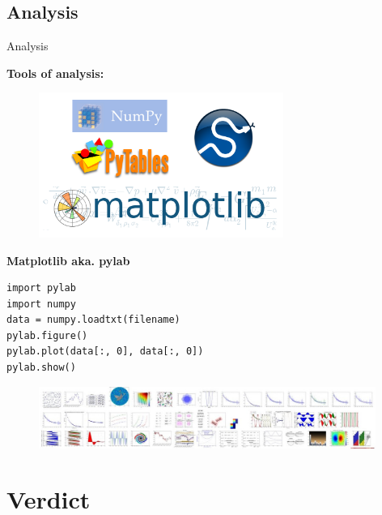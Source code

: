 \documentclass{beamer}
\begin{document}
\subsection{Analysis}

\begin{frame}[fragile]{Analysis}

\textbf{Tools of analysis:}


\begin{figure}[ht]
	\includegraphics[width=8cm]{analysis.png}
\end{figure}

\end{frame}

\begin{frame}[fragile]

\textbf{Matplotlib aka. pylab}

\begin{verbatim}
import pylab
import numpy
data = numpy.loadtxt(filename)
pylab.figure()
pylab.plot(data[:, 0], data[:, 0])
pylab.show()
\end{verbatim}

\begin{figure}[ht]
	\includegraphics[width=11cm]{matplotlib_examples.jpg}
\end{figure}

\end{frame}

\section{Verdict}
\end{document}
